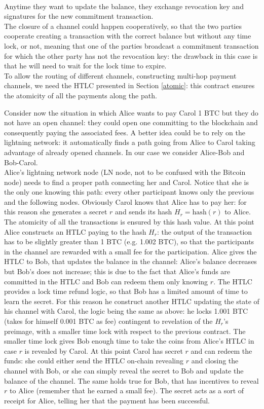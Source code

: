 \\
Anytime they want to update the balance, they exchange revocation key and signatures for the new commitment transaction.
\\
The closure of a channel could happen cooperatively, so that the two parties cooperate creating a transaction with the correct balance but without any time lock, or not, meaning that one of the parties broadcast a commitment transaction for which the other party has not the revocation key: the drawback in this case is that he will need to wait for the lock time to expire.  
\\
To allow the routing of different channels, constructing multi-hop payment channels, we need the HTLC presented in Section \ref{atomic}: this contract ensures the atomicity of all the payments along the path.

\bigskip
\noindent
Consider now the situation in which Alice wants to pay Carol 1 BTC but they do not have an open channel: they could open one committing to the blockchain and consequently paying the associated fees. A better idea could be to rely on the lightning network: it automatically finds a path going from Alice to Carol taking advantage of already opened channels. In our case we consider Alice-Bob and Bob-Carol.
\\
Alice's lightning network node (LN node, not to be confused with the Bitcoin node) needs to find a proper path connecting her and Carol. Notice that she is the only one knowing this path: every other participant knows only the previous and the following nodes. Obviously Carol knows that Alice has to pay her: for this reason she generates a secret $r$ and sends its hash $H_r = \text{hash}(r)$ to Alice. The atomicity of all the transactions is ensured by this hash value. At this point Alice constructs an HTLC paying to the hash $H_r$: the output of the transaction has to be slightly greater than 1 BTC (e.g. 1.002 BTC), so that the participants in the channel are rewarded with a small fee for the participation. Alice gives the HTLC to Bob, that updates the balance in the channel: Alice's balance decreases but Bob's does not increase; this is due to the fact that Alice's funds are committed in the HTLC and Bob can redeem them only knowing $r$. The HTLC provides a lock time refund logic, so that Bob has a limited amount of time to learn the secret. For this reason he construct another HTLC updating the state of his channel with Carol, the logic being the same as above: he locks 1.001 BTC (takes for himself 0.001 BTC as fee) contingent to revelation of the $H_r$'s preimage, with a smaller time lock with respect to the previous contract. The smaller time lock gives Bob enough time to take the coins from Alice's HTLC in case $r$ is revealed by Carol. At this point Carol has secret $r$ and can redeem the funds: she could either send the HTLC on-chain revealing $r$ and closing the channel with Bob, or she can simply reveal the secret to Bob and update the balance of the channel. The same holds true for Bob, that has incentives to reveal $r$ to Alice (remember that he earned a small fee). The secret acts as a sort of receipt for Alice, telling her that the payment has been successful.


